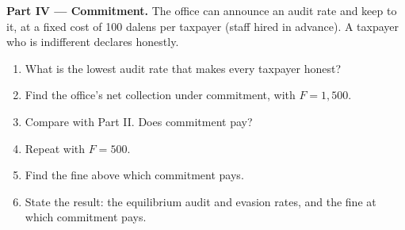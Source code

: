 \begin{problem}
\medskip
\noindent\textbf{Part IV --- Commitment.} The office can announce an audit rate and keep to it, at a fixed cost of
100 dalens per taxpayer (staff hired in advance). A taxpayer who is indifferent declares honestly.
\begin{enumerate}[resume]
  \item What is the lowest audit rate that makes every taxpayer honest?
  \item Find the office's net collection under commitment, with $F = 1{,}500$.
  \item Compare with Part II. Does commitment pay?
  \item Repeat with $F = 500$.
  \item Find the fine above which commitment pays.
  \item State the result: the equilibrium audit and evasion rates, and the fine at which commitment pays.
\end{enumerate}
\end{problem}
